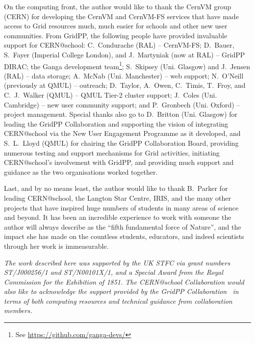 On the computing front, the author would like to thank
the CernVM group (\acs{CERN}) for developing the CernVM
and CernVM-FS services that have made access to Grid resources
much, much easier for schools and other new user communities.
%
From GridPP, the following people have provided invaluable support
for CERN@school:
C.~Condurache (RAL) -- CernVM-FS;
%
D.~Bauer, S.~Fayer (Imperial College London),
and J.~Martyniak (now at RAL) -- GridPP DIRAC;
%
the Ganga development team\footnote{%
See \href{https://github.com/ganga-devs/}{https://github.com/ganga-devs/}};
S.~Skipsey (Uni. Glasgow) and J.~Jensen (RAL) -- data storage;
%
A.~McNab (Uni. Manchester) -- web support;
N.~O'Neill (previously at QMUL) -- outreach;
%
D.~Taylor, A.~Owen, C.~Timis, T.~Froy, and C.~J.~Walker (QMUL) -- QMUL Tier-2 cluster support;
%
J.~Coles (Uni. Cambridge) -- new user community support;
and
%
P.~Gronbech (Uni. Oxford) -- project management.
%
%
Special thanks also go to
D.~Britton (Uni. Glasgow) for leading the GridPP Collaboration
and supporting the vision of integrating CERN@school via
the New User Engagement Programme
as it developed,
and
%
S.~L.~Lloyd (QMUL) for chairing the GridPP Collaboration Board,
providing numerous testing and support mechanisms for Grid
activities, initiating CERN@school's involvement with GridPP,
and providing much support and guidance as the two
organisations worked together.

Last, and by no means least, the author would like to thank
B.~Parker for leading CERN@school, the Langton Star Centre,
\acs{IRIS}, and the many other projects that have inspired
huge numbers of students in many areas of science and beyond.
It has been an incredible experience to work with someone the
author will always describe as the
``fifth fundamental force of Nature'',
and the impact she has made on the countless students,
educators, and indeed scientists through her work is
immeasurable.

{\em The work described here was supported by the
UK \acf{STFC} via grant numbers ST/J000256/1 and ST/N00101X/1,
and a Special Award from the Royal Commission for the Exhibition of 1851.
%
The CERN@school Collaboration would also like to acknowledge the
support provided by
the GridPP Collaboration~\cite{GridPP2006,GridPP2009}
in terms of both computing resources and technical guidance
from collaboration members.}
